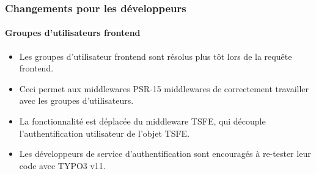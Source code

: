%

\begin{frame}[fragile]
	\frametitle{Changements pour les développeurs}
	\framesubtitle{Groupes d'utilisateurs frontend}


	\begin{itemize}
		\item Les groupes d'utilisateur frontend sont résolus plus tôt lors de la
			requête frontend.
		\item Ceci permet aux middlewares PSR-15 middlewares de correctement travailler avec les groupes d'utilisateurs.
		\item La fonctionnalité est déplacée du middleware TSFE, qui découple l'authentification
			utilisateur de l'objet TSFE.
		\item Les développeurs de service d'authentification sont encouragés à re-tester leur code avec
			TYPO3 v11.
	\end{itemize}

\end{frame}

